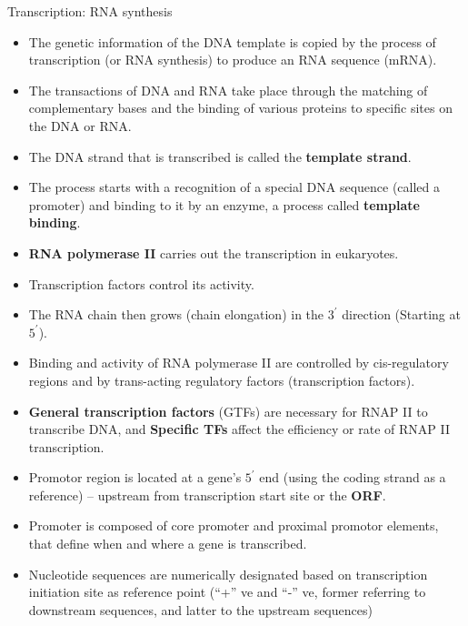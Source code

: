 \documentclass[11pt,ignorenonframetext,aspectratio=169]{beamer}
\providecommand{\tightlist}{%
  \setlength{\itemsep}{0pt}\setlength{\parskip}{0pt}}
\begin{document}
\begin{frame}{Transcription: RNA synthesis}
\protect\hypertarget{transcription-rna-synthesis}{}
\begin{itemize}
\tightlist
\item
  The genetic information of the DNA template is copied by the process
  of transcription (or RNA synthesis) to produce an RNA sequence (mRNA).
\item
  The transactions of DNA and RNA take place through the matching of
  complementary bases and the binding of various proteins to specific
  sites on the DNA or RNA.
\item
  The DNA strand that is transcribed is called the \textbf{template
  strand}.
\item
  The process starts with a recognition of a special DNA sequence
  (called a promoter) and binding to it by an enzyme, a process called
  \textbf{template binding}.
\item
  \textbf{RNA polymerase II} carries out the transcription in
  eukaryotes.
\item
  Transcription factors control its activity.
\item
  The RNA chain then grows (chain elongation) in the \(3^\prime\)
  direction (Starting at \(5^\prime\)).
\end{itemize}
\end{frame}

\begin{frame}{}
\protect\hypertarget{section-20}{}
\begin{itemize}
\tightlist
\item
  Binding and activity of RNA polymerase II are controlled by
  cis-regulatory regions and by trans-acting regulatory factors
  (transcription factors).
\item
  \textbf{General transcription factors} (GTFs) are necessary for RNAP
  II to transcribe DNA, and \textbf{Specific TFs} affect the efficiency
  or rate of RNAP II transcription.
\item
  Promotor region is located at a gene's \(5^\prime\) end (using the
  coding strand as a reference) -- upstream from transcription start
  site or the \textbf{ORF}.
\item
  Promoter is composed of core promoter and proximal promotor elements,
  that define when and where a gene is transcribed.
\item
  Nucleotide sequences are numerically designated based on transcription
  initiation site as reference point (``+'' ve and ``-'' ve, former
  referring to downstream sequences, and latter to the upstream
  sequences)
\end{itemize}
\end{frame}
\end{document}
